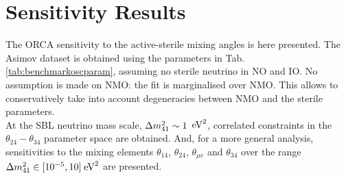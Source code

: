\section{Sensitivity Results}
\label{sec:sensi}
The ORCA sensitivity to the active-sterile mixing angles is here presented. The Asimov dataset is obtained using the parameters in Tab. \ref{tab:benchmarkoscparam}, assuming no sterile neutrino in NO and IO. No assumption is made on NMO: the fit is marginalised over NMO. This allows to conservatively take into account degeneracies between NMO and the sterile parameters.
\\
At the SBL neutrino mass scale, $\Delta m^2_{41} \sim 1$ $\rm{eV}^2$, correlated constraints in the $\theta_{24} -\theta_{34}$ parameter space are obtained. And, for a more general analysis, sensitivities to the mixing elements $\theta_{14}$, $\theta_{24}$, $\theta_{\mu e}$ and $\theta_{34}$ over the range $\Delta m^2_{41} \in [10^{-5}, 10] \; \rm{eV}^2$ are presented.

